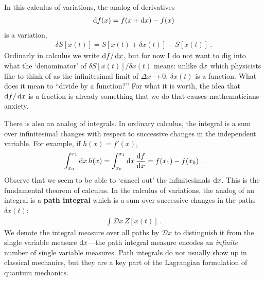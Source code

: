 In this calculus of variations, the analog of derivatives 
\begin{align}
    \operatorname{d}\mkern-3mu^{}\mkern-1mu{f}(x) = f(x+\operatorname{d}\mkern-3mu^{}\mkern-1mu{x}) - f(x) 
\end{align}
is a variation,
\begin{align}
    \delta S[x(t)] = 
     S[x(t)+\delta x(t)] - S[x(t)] 
     \ .
\end{align}
Ordinarly in calculus we write $\operatorname{d}\mkern-3mu^{}\mkern-1mu{f}/\operatorname{d}\mkern-3mu^{}\mkern-1mu{x}$, but for now I do not want to dig into what the `denominator' of $\delta S[x(t)]/\delta x(t)$ means: unlike $\operatorname{d}\mkern-3mu^{}\mkern-1mu{x}$ which physicists like to think of as the infinitesimal limit of $\Delta x \to 0$, $\delta x(t)$ is a function. What does it mean to ``divide by a function?'' For what it is worth, the idea that $\operatorname{d}\mkern-3mu^{}\mkern-1mu{f}/\operatorname{d}\mkern-3mu^{}\mkern-1mu{x}$ is a fraction is already something that we do that causes mathematicians anxiety.

There is also an analog of integrals. In ordinary calculus, the integral is a sum over infinitesimal changes with respect to successive changes in the independent variable. For example, if $h(x) = f'(x)$,
\begin{align}
    \int_{x_0}^{x_1} \operatorname{d}\mkern-3mu^{}\mkern-1mu{x} \, h(x)
    =
    \int_{x_0}^{x_1} \operatorname{d}\mkern-3mu^{}\mkern-1mu{x} \, \frac{ \operatorname{d}\mkern-3mu^{}\mkern-1mu{f} }{ \operatorname{d}\mkern-3mu^{}\mkern-1mu{x} } 
    = f(x_1) - f(x_0)
    \ .
\end{align}
Observe that we seem to be able to `cancel out' the infinitesimals $\operatorname{d}\mkern-3mu^{}\mkern-1mu{x}$. This is the fundamental theorem of calculus. In the calculus of variations, the analog of an integral is a \textbf{path integral} which is a sum over successive changes in the paths $\delta x(t)$:
\begin{align}
    \int \mathcal{D}x\, Z[x(t)] \ .
\end{align}
We denote the integral measure over all paths by $\mathcal{D}x$ to distinguish it from the single variable measure $\operatorname{d}\mkern-3mu^{}\mkern-1mu{x}$---the path integral measure encodes an \emph{infinite} number of single variable measures. Path integrals do not usually show up in classical mechanics, but they are a key part of the Lagrangian formulation of quantum mechanics.


